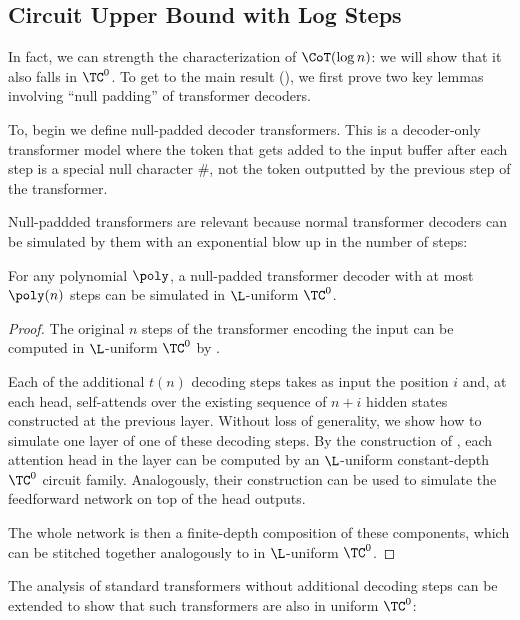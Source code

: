 \subsection{Circuit Upper Bound with Log Steps}

In fact, we can strength the characterization of $\CoT(\log n)$: we will show that it also falls in $\TC^0$. To get to the main result (), we first prove two key lemmas involving ``null padding'' of transformer decoders.

To, begin we define null-padded decoder transformers. This is a decoder-only transformer model where the token that gets added to the input buffer after each step is a special null character $\#$, not the token outputted by the previous step of the transformer.

Null-paddded transformers are relevant because normal transformer decoders can be simulated by them with an exponential blow up in the number of steps: 

\begin{lemma} \label{lem:poly-padding-tc0}
    For any polynomial $\poly$, a null-padded transformer decoder with at most $\poly(n)$ steps can be simulated in $\L$-uniform $\TC^0$.    
\end{lemma}

\begin{proof}
    The original $n$ steps of the transformer encoding the input can be computed in $\L$-uniform $\TC^0$ by \citet{merrill2023parallelism}.

    Each of the additional $t(n)$ decoding steps takes as input the position $i$ and, at each head, self-attends over the existing sequence of $n + i$ hidden states constructed at the previous layer.
    Without loss of generality, we show how to simulate one layer of one of these decoding steps.
    By the construction of \citet{merrill2023parallelism}, each attention head in the layer can be computed by an $\L$-uniform constant-depth $\TC^0$ circuit family.
    Analogously, their construction can be used to simulate the feedforward network on top of the head outputs.

    The whole network is then a finite-depth composition of these components, which can be stitched together analogously to \citet{merrill2023parallelism} in $\L$-uniform $\TC^0$.
\end{proof}

The analysis of standard transformers without additional decoding steps \citep{merrill2023parallelism} can be extended to show that such transformers are also in uniform $\TC^0$:

